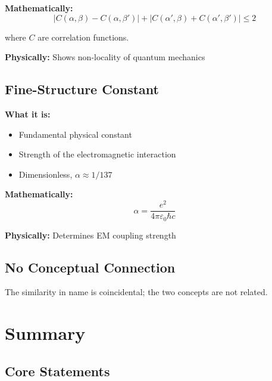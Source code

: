 	\textbf{Mathematically:}
	\begin{equation}
		|C(\alpha, \beta) - C(\alpha, \beta')| + |C(\alpha', \beta) + C(\alpha', \beta')| \leq 2
	\end{equation}
	
	where $C$ are correlation functions.
	
	\textbf{Physically:} Shows non-locality of quantum mechanics
	
	\subsection{Fine-Structure Constant}
	
	\textbf{What it is:}
	\begin{itemize}
		\item Fundamental physical constant
		\item Strength of the electromagnetic interaction
		\item Dimensionless, $\alpha \approx 1/137$
	\end{itemize}
	
	\textbf{Mathematically:}
	\begin{equation}
		\alpha = \frac{e^2}{4\pi\varepsilon_0\hbar c}
	\end{equation}
	
	\textbf{Physically:} Determines EM coupling strength
	
	\subsection{No Conceptual Connection}
	
	The similarity in name is coincidental; the two concepts are not related.
	
	\section{Summary}
	
	\subsection{Core Statements}
	
